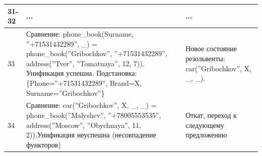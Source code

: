 \documentclass[12pt]{report}
\begin{document}
\begin{table}[H]
\begin{center}
\begin{tabular}{|p{1 cm}|p{11 cm}|p{7 cm}|}
			\hline
			31-32 & ... & ... \\
			\hline
			33 & Сравнение: \newline phone\_book(Surname, ''+71531432289'', \_) = \newline phone\_book(''Gribochkov'', ''+71531432289'', address(''Tver'', ''Tomatnaya'', 12, 7)). \newline Унификация успешна. \newline Подстановка: \{Phone=''+71531432289'', Brand=X, Surname=''Gribochkov''\} & Новое состояние резольвенты: \newline car(''Gribochkov'', X, \_, \_). \\
			\hline
			34 & Сравнение: \newline car(''Gribochkov'', X, \_, \_) = \newline phone\_book(''Malyshev'', ''+78005553535'', address(''Moscow'', ''Obychnaya'', 11, 2)).\newline Унификация неуспешна (несовпадение функторов) & Откат, переход к следующему предложению \\
			\hline
		\end{tabular}
	\end{center}
\end{table} 
\end{document}
